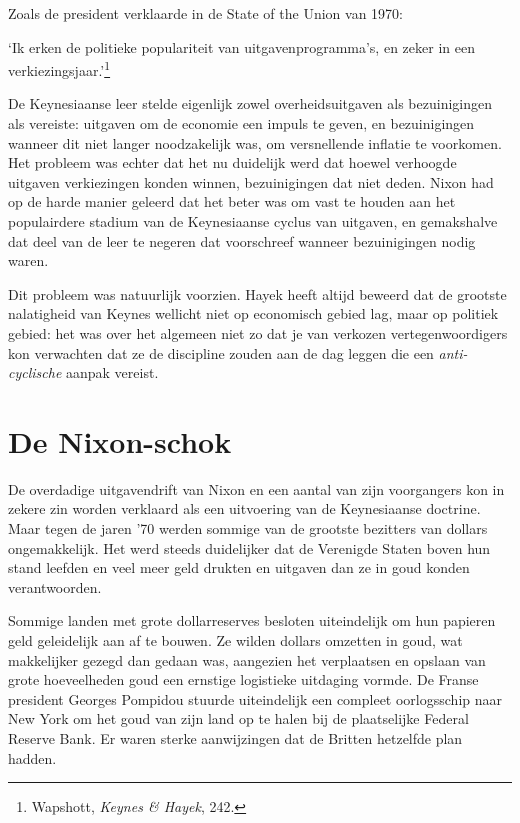 \documentclass[
  a5paper,
  smalldemyvopaper,11pt,twoside,onecolumn,openright,extrafontsizes,
hidelinks]{memoir}
\renewenvironment{quote}%
               {\list{}{\rightmargin=.3cm\leftmargin=.3cm}%
                \itshape \item[]}%
               {\endlist}
\begin{document}
Zoals de president verklaarde in de State of the Union van 1970:

\begin{quote}
`Ik erken de politieke populariteit van uitgavenprogramma's, en zeker in
een verkiezingsjaar.'\footnote{\hspace{0pt}Wapshott, \emph{Keynes \&
  Hayek}, 242.}
\end{quote}

De Keynesiaanse leer stelde eigenlijk zowel overheidsuitgaven als
bezuinigingen als vereiste: uitgaven om de economie een impuls te geven,
en bezuinigingen wanneer dit niet langer noodzakelijk was, om
versnellende inflatie te voorkomen. Het probleem was echter dat het nu
duidelijk werd dat hoewel verhoogde uitgaven verkiezingen konden winnen,
bezuinigingen dat niet deden. Nixon had op de harde manier geleerd dat
het beter was om vast te houden aan het populairdere stadium van de
Keynesiaanse cyclus van uitgaven, en gemakshalve dat deel van de leer te
negeren dat voorschreef wanneer bezuinigingen nodig waren.

Dit probleem was natuurlijk voorzien. Hayek heeft altijd beweerd dat de
grootste nalatigheid van Keynes wellicht niet op economisch gebied lag,
maar op politiek gebied: het was over het algemeen niet zo dat je van
verkozen vertegenwoordigers kon verwachten dat ze de discipline zouden
aan de dag leggen die een \emph{anti-cyclische} aanpak vereist.

\section{De Nixon-schok}\label{de-nixon-schok}

De overdadige uitgavendrift van Nixon en een aantal van zijn voorgangers
kon in zekere zin worden verklaard als een uitvoering van de
Keynesiaanse doctrine. Maar tegen de jaren '70 werden sommige van de
grootste bezitters van dollars ongemakkelijk. Het werd steeds
duidelijker dat de Verenigde Staten boven hun stand leefden en veel meer
geld drukten en uitgaven dan ze in goud konden verantwoorden.

Sommige landen met grote dollarreserves besloten uiteindelijk om hun
papieren geld geleidelijk aan af te bouwen. Ze wilden dollars omzetten
in goud, wat makkelijker gezegd dan gedaan was, aangezien het
verplaatsen en opslaan van grote hoeveelheden goud een ernstige
logistieke uitdaging vormde. De Franse president Georges Pompidou
stuurde uiteindelijk een compleet oorlogsschip naar New York om het goud
van zijn land op te halen bij de plaatselijke Federal Reserve Bank. Er
waren sterke aanwijzingen dat de Britten hetzelfde plan hadden.
\end{document}
